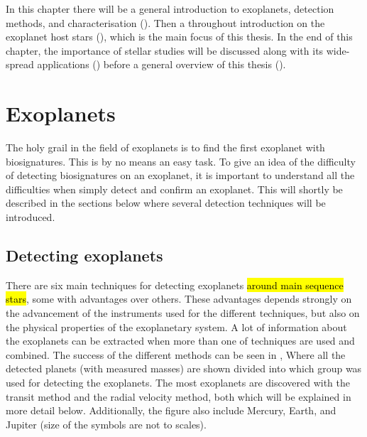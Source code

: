 In this chapter there will be a general introduction to exoplanets, detection methods, and
characterisation (). Then a throughout introduction on the exoplanet host stars
(), which is the main focus of this thesis. In the end of this chapter,
the importance of stellar studies will be discussed along with its wide-spread applications
() before a general overview of this thesis ().



\section{Exoplanets}
\label{sec:exoplanets}

The holy grail in the field of exoplanets is to find the first exoplanet with biosignatures. This is
by no means an easy task. To give an idea of the difficulty of detecting biosignatures on an
exoplanet, it is important to understand all the difficulties when simply detect and confirm an
exoplanet. This will shortly be described in the sections below where several detection techniques
will be introduced.

\subsection{Detecting exoplanets}
\label{sec:detecting_exoplanets}

There are six main techniques for detecting exoplanets \hl{around main sequence stars}, some with
advantages over others. These advantages depends strongly on the advancement of the instruments used
for the different techniques, but also on the physical properties of the exoplanetary system. A lot
of information about the exoplanets can be extracted when more than one of techniques are used and
combined. The success of the different methods can be seen in , Where all
the detected planets (with measured masses) are shown divided into which group was used for
detecting the exoplanets. The most exoplanets are discovered with the transit method and the radial
velocity method, both which will be explained in more detail below. Additionally, the figure also
include Mercury, Earth, and Jupiter (size of the symbols are not to scales).

